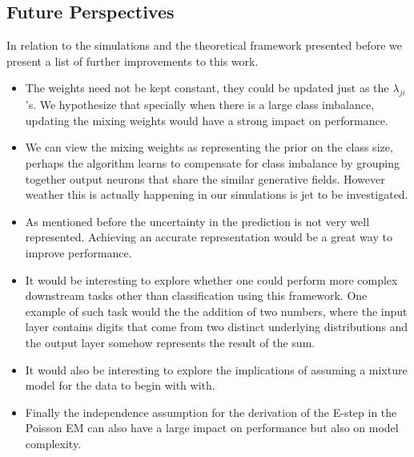 \documentclass{article}
\begin{document}
\subsection{Future Perspectives}
In relation to the simulations and the theoretical framework presented before we present a list of further improvements to this work.

\begin{itemize}
\item
	The weights need not be kept constant, they could be updated just as the $\lambda_{ji}$'s. We hypothesize that specially when there is a large class imbalance, updating the mixing weights would have a strong impact on performance.  
\item 
	We can view the mixing weights as representing the prior on the class size, perhaps the algorithm learns to compensate for class imbalance by grouping together output neurons that share the similar generative fields. However weather this is actually happening in our simulations is jet to be investigated. 
\item
	As mentioned before the uncertainty in the prediction is not very well represented. Achieving an accurate representation would be a great way to improve performance. 
\item
	It would be interesting to explore whether one could perform more complex downstream tasks other than classification using this framework. One example of such task would the the addition of two numbers, where the input layer contains digits that come from two distinct underlying distributions and the output layer somehow represents the result of the sum. 
\item
	It would also be interesting to explore the implications of assuming a mixture model for the data to begin with with.
\item
	Finally the independence assumption for the derivation of the E-step in the Poisson EM can also have a large impact on performance but also on model complexity. 
\end{itemize}

\pagebreak
\printbibliography
\end{document}

